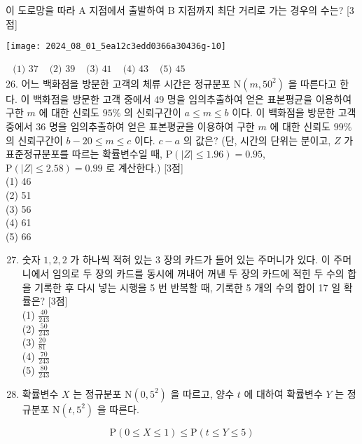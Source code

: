 \documentclass[10pt]{article}
\begin{document}
이 도로망을 따라 A 지점에서 출발하여 B 지점까지 최단 거리로 가는 경우의 수는? [3점]

\begin{center}
\texttt{[image: 2024\_08\_01\_5ea12c3edd0366a30436g-10]}
\end{center}

$\begin{array}{lllll}\text { (1) } 37 & \text { (2) } 39 & \text { (3) } 41 & \text { (4) } 43 & \text { (5) } 45\end{array}$\\
26. 어느 백화점을 방문한 고객의 체류 시간은 정규분포 $\mathrm{N}\left(m, 50^{2}\right)$ 을 따른다고 한다. 이 백화점을 방문한 고객 중에서 49 명을 임의추출하여 얻은 표본평균을 이용하여 구한 $m$ 에 대한 신뢰도 $95 \%$ 의 신뢰구간이 $a \leq m \leq b$ 이다. 이 백화점을 방문한 고객 중에서 36 명을 임의추출하여 얻은 표본평균을 이용하여 구한 $m$ 에 대한 신뢰도 $99 \%$ 의 신뢰구간이 $b-20 \leq m \leq c$ 이다. $c-a$ 의 값은? (단, 시간의 단위는 분이고, $Z$ 가 표준정규분포를 따르는 확률변수일 때, $\mathrm{P}(|Z| \leq 1.96)=0.95$, $\mathrm{P}(|Z| \leq 2.58)=0.99$ 로 계산한다.) [3점]\\
(1) 46\\
(2) 51\\
(3) 56\\
(4) 61\\
(5) 66

\begin{enumerate}
  \setcounter{enumi}{26}
  \item 숫자 $1,2,2$ 가 하나씩 적혀 있는 3 장의 카드가 들어 있는 주머니가 있다. 이 주머니에서 임의로 두 장의 카드를 동시에 꺼내어 꺼낸 두 장의 카드에 적힌 두 수의 합을 기록한 후 다시 넣는 시행을 5 번 반복할 때, 기록한 5 개의 수의 합이 17 일 확률은? [3점]\\
(1) $\frac{40}{243}$\\
(2) $\frac{50}{243}$\\
(3) $\frac{20}{81}$\\
(4) $\frac{70}{243}$\\
(5) $\frac{80}{243}$

  \item 확률변수 $X$ 는 정규분포 $\mathrm{N}\left(0,5^{2}\right)$ 을 따르고, 양수 $t$ 에 대하여 확률변수 $Y$ 는 정규분포 $\mathrm{N}\left(t, 5^{2}\right)$ 을 따른다.

\end{enumerate}

\[
\mathrm{P}(0 \leq X \leq 1) \leq \mathrm{P}(t \leq Y \leq 5)
\]
\end{document}
